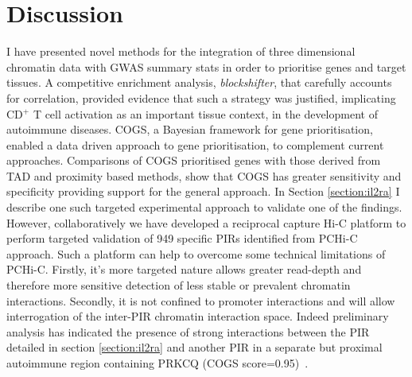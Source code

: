 \documentclass[a4paper,11pt]{report}
\begin{document}

\chapter{Discussion}

I have presented novel methods for the integration of three dimensional chromatin data with GWAS summary stats in order to prioritise genes and target tissues. A competitive enrichment analysis, \textit{blockshifter}, that carefully accounts for correlation, provided evidence that such a strategy was justified, implicating CD${^+}$ T cell activation as an important tissue context, in the development of autoimmune diseases.  COGS, a Bayesian framework for gene  prioritisation, enabled a data driven approach to gene prioritisation, to complement current approaches.  Comparisons of COGS prioritised genes with those derived from TAD and proximity based methods,  show that COGS has greater sensitivity and specificity providing support for the general approach.  In Section \ref{section:il2ra} I describe one such targeted experimental approach to validate one of the findings. However, collaboratively we have developed a reciprocal capture Hi-C platform to perform targeted validation of 949 specific PIRs identified from PCHi-C approach. Such a platform can  help to overcome some technical limitations of PCHi-C. Firstly, it's more targeted nature allows greater read-depth and therefore more sensitive detection of less stable or prevalent chromatin interactions. Secondly, it is not confined to promoter interactions and will allow interrogation of the inter-PIR chromatin interaction space. Indeed preliminary analysis has indicated the presence of strong interactions between the PIR detailed in section \ref{section:il2ra} and another PIR in a separate but proximal autoimmune region containing PRKCQ (COGS score=0.95)~\citep{LoweCooperBruskoEtAl2007}. 
\end{document}
